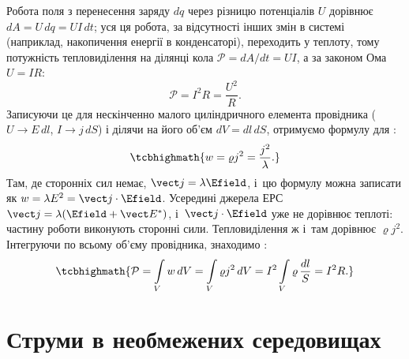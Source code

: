 Робота
поля з перенесення заряду $dq$ через різницю потенціалів $U$ дорівнює $dA = U\, dq = UI\, dt$; уся ця робота, за відсутності інших змін в системі
(наприклад, накопичення енергії в конденсаторі), переходить у теплоту, тому потужність тепловиділення на ділянці кола $\mathcal P = dA/dt = UI$, а
за законом Ома $U=IR$:
\begin{equation*}
	\mathcal P = I^2 R = \frac{U^2}{R}.
\end{equation*}
Записуючи це для нескінченно малого циліндричного елемента провідника ($U \to E\, dl$, $I \to j\, dS$) і ділячи на його об'єм $dV = dl\, dS$,
отримуємо формулу для :
\begin{equation}\label{eq:JouleLenzDiff}
	\tcbhighmath{
		w = \varrho j^2 = \frac{j^2}{\lambda}.
	}
\end{equation}
Там, де сторонніх сил немає, $\vect j = \lambda\Efield$, і~цю формулу можна записати як $w = \lambda E^2 = \vect j\cdot\Efield$. Усередині
джерела ЕРС $\vect j = \lambda(\Efield + \vect E^*)$, і~$\vect j\cdot\Efield$ уже не дорівнює теплоті: частину роботи виконують сторонні
сили. Тепловиділення ж і~там дорівнює $\varrho j^2$.
Інтегруючи по всьому об'єму провідника, знаходимо :
\begin{equation}\label{eq:JouleLenzIntegral}
	\tcbhighmath{
		\mathcal P = \int\limits_V w\, dV = \int\limits_V \varrho j^2\, dV = I^2\int\limits_V \varrho\,\frac{dl}{S} = I^2 R.
	}
\end{equation}


\section{Струми в необмежених середовищах}\label{sec:CurrentsInUnboundedMedia}\hypertarget{currents-in-unbounded-media}{}


